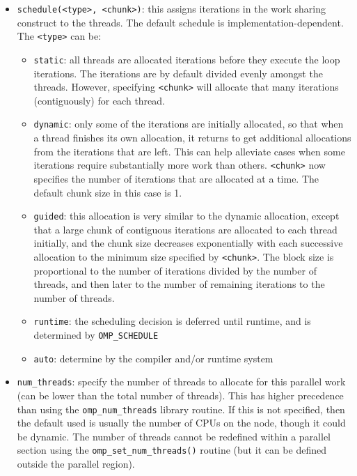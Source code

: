 \documentclass[10pt]{article}
\newcounter{subsubsubsection}[subsubsection]
\begin{document}
\begin{flushleft}

\begin{itemize}
\item {\tt schedule(<type>, <chunk>)}: this assigns iterations in the work sharing construct to the threads. The default schedule is implementation-dependent. The {\tt <type>} can be:
	\begin{itemize}
		\item {\tt static}: all threads are allocated iterations before they execute the loop iterations. The iterations are by default divided evenly amongst the threads. However, specifying {\tt <chunk>} will allocate that many iterations (contiguously) for each thread.
		\item {\tt dynamic}: only some of the iterations are initially allocated, so that when a thread finishes its own allocation, it returns to get additional allocations from the iterations that are left. This can help alleviate cases when some iterations require substantially more work than others. {\tt <chunk>} now specifies the number of iterations that are allocated at a time. The default chunk size in this case is 1.
		\item {\tt guided}: this allocation is very similar to the dynamic allocation, except that a large chunk of contiguous iterations are allocated to each thread initially, and the chunk size decreases exponentially with each successive allocation to the minimum size specified by {\tt <chunk>}. The block size is proportional to the number of iterations divided by the number of threads, and then later to the number of remaining iterations to the number of threads. 
		\item {\tt runtime}: the scheduling decision is deferred until runtime, and is determined by {\tt OMP\_SCHEDULE}
		\item {\tt auto}: determine by the compiler and/or runtime system
	\end{itemize}
\item {\tt num\_threads}: specify the number of threads to allocate for this parallel work (can be lower than the total number of threads). This has higher precedence than using the {\tt omp\_num\_threads} library routine. If this is not specified, then the default used is usually the number of CPUs on the node, though it could be dynamic. The number of threads cannot be redefined within a parallel section using the {\tt omp\_set\_num\_threads()} routine (but it can be defined outside the parallel region). 
\end{itemize}


\end{flushleft}
\end{document}
